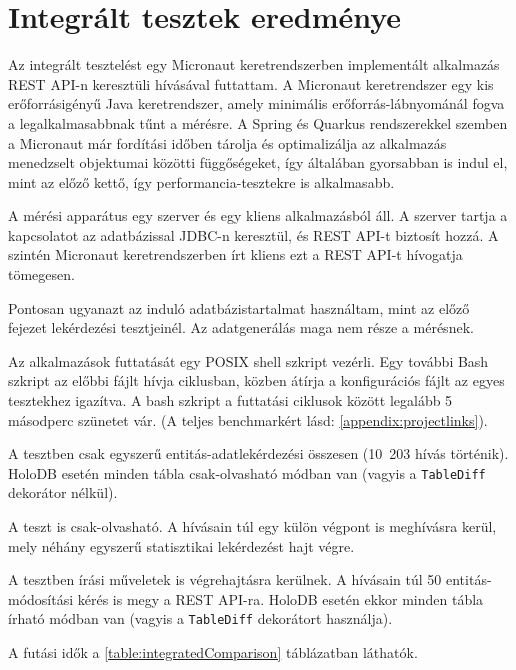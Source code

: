 \documentclass[
    parspace,
    noindent,
    nohyp,
]{elteiktdk}[2023/04/10]
\newcommand{\textbftt}[1]{{\fontfamily{lmtt}\fontseries{b}\selectfont{#1}}}
\begin{document}
\section{Integrált tesztek eredménye}

Az integrált tesztelést egy Micronaut keretrendszerben implementált
alkalmazás REST API-n keresztüli hívásával futtattam.
A Micronaut keretrendszer egy kis erőforrásigényű Java keretrendszer,
amely minimális erőforrás-lábnyománál fogva a legalkalmasabbnak tűnt a mérésre.
A Spring és Quarkus rendszerekkel szemben a Micronaut már fordítási időben
tárolja és optimalizálja az alkalmazás menedzselt objektumai közötti függőségeket,
így általában gyorsabban is indul el, mint az előző kettő,
így performancia-tesztekre is alkalmasabb.

A mérési apparátus egy szerver és egy kliens alkalmazásból áll.
A szerver tartja a kapcsolatot az adatbázissal JDBC-n keresztül,
és REST API-t biztosít hozzá.
A szintén Micronaut keretrendszerben írt kliens ezt a REST API-t hívogatja tömegesen.

Pontosan ugyanazt az induló adatbázistartalmat használtam,
mint az előző fejezet lekérdezési tesztjeinél.
Az adatgenerálás maga nem része a mérésnek.

Az alkalmazások futtatását egy POSIX shell szkript vezérli.
Egy további Bash szkript az előbbi fájlt hívja ciklusban,
közben átírja a konfigurációs fájlt az egyes tesztekhez igazítva.
A bash szkript a futtatási ciklusok között legalább 5 másodperc szünetet vár.
(A teljes benchmarkért lásd: \autoref{appendix:projectlinks}).

A \textbftt{RO-SIMP} tesztben csak egyszerű entitás-adatlekérdezési
összesen (10~203 hívás történik).
HoloDB esetén minden tábla csak-olvasható módban van
(vagyis a \texttt{TableDiff} dekorátor nélkül).

A \textbftt{RO-CMPX} teszt is csak-olvasható.
A \textbftt{RO-SIMP} hívásain túl egy külön végpont is meghívásra kerül,
mely néhány egyszerű statisztikai lekérdezést hajt végre.

A \textbftt{WR-CMPX} tesztben írási műveletek is végrehajtásra kerülnek.
A \textbftt{RO-SIMP} hívásain túl 50 entitás-módosítási kérés is megy a REST API-ra.
HoloDB esetén ekkor minden tábla írható módban van
(vagyis a \texttt{TableDiff} dekorátort használja).

A futási idők a \ref{table:integratedComparison} táblázatban láthatók.
\end{document}
